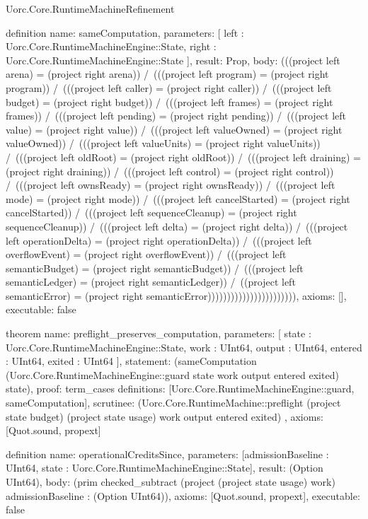\begin{lexlean}{Uorc.Core.RuntimeMachineRefinement}
\begin{semanticmodule}
definition{
  name: sameComputation,
  parameters: [
    left : Uorc.Core.RuntimeMachineEngine::State,
    right : Uorc.Core.RuntimeMachineEngine::State
  ],
  result: Prop,
  body: (((project left arena) = (project right arena)) /\ (((project left program) = (project right program)) /\ (((project left caller) = (project right caller)) /\ (((project left budget) = (project right budget)) /\ (((project left frames) = (project right frames)) /\ (((project left pending) = (project right pending)) /\ (((project left value) = (project right value)) /\ (((project left valueOwned) = (project right valueOwned)) /\ (((project left valueUnits) = (project right valueUnits)) /\ (((project left oldRoot) = (project right oldRoot)) /\ (((project left draining) = (project right draining)) /\ (((project left control) = (project right control)) /\ (((project left ownsReady) = (project right ownsReady)) /\ (((project left mode) = (project right mode)) /\ (((project left cancelStarted) = (project right cancelStarted)) /\ (((project left sequenceCleanup) = (project right sequenceCleanup)) /\ (((project left delta) = (project right delta)) /\ (((project left operationDelta) = (project right operationDelta)) /\ (((project left overflowEvent) = (project right overflowEvent)) /\ (((project left semanticBudget) = (project right semanticBudget)) /\ (((project left semanticLedger) = (project right semanticLedger)) /\ ((project left semanticError) = (project right semanticError))))))))))))))))))))))),
  axioms: [],
  executable: false
}

theorem{
  name: preflight_preserves_computation,
  parameters: [
    state : Uorc.Core.RuntimeMachineEngine::State,
    work : UInt64,
    output : UInt64,
    entered : UInt64,
    exited : UInt64
  ],
  statement: (sameComputation (Uorc.Core.RuntimeMachineEngine::guard state work output entered exited) state),
  proof: term_cases{
    definitions: [Uorc.Core.RuntimeMachineEngine::guard, sameComputation],
    scrutinee: (Uorc.Core.RuntimeMachine::preflight (project state budget) (project state usage) work output entered exited)
  },
  axioms: [Quot.sound, propext]
}

definition{
  name: operationalCreditsSince,
  parameters: [admissionBaseline : UInt64, state : Uorc.Core.RuntimeMachineEngine::State],
  result: (Option UInt64),
  body: (prim checked_subtract (project (project state usage) work) admissionBaseline : (Option UInt64)),
  axioms: [Quot.sound, propext],
  executable: false
}


\end{semanticmodule}
\end{lexlean}
